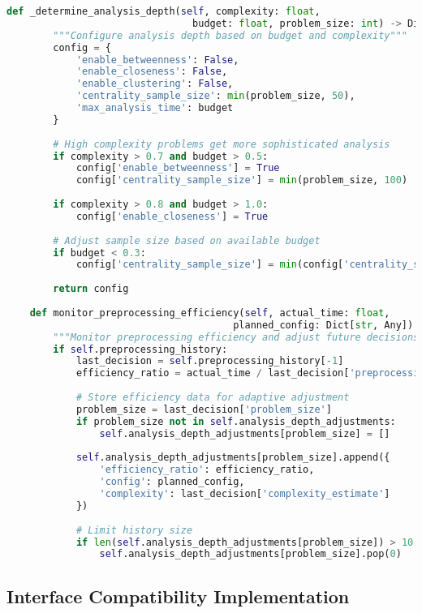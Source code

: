 \begin{lstlisting}[language=Python, caption=Adaptive Timing Synchronisation for Consistent Overhead]
    def _determine_analysis_depth(self, complexity: float, 
                                budget: float, problem_size: int) -> Dict[str, Any]:
        """Configure analysis depth based on budget and complexity"""
        config = {
            'enable_betweenness': False,
            'enable_closeness': False,
            'enable_clustering': False,
            'centrality_sample_size': min(problem_size, 50),
            'max_analysis_time': budget
        }
        
        # High complexity problems get more sophisticated analysis
        if complexity > 0.7 and budget > 0.5:
            config['enable_betweenness'] = True
            config['centrality_sample_size'] = min(problem_size, 100)
        
        if complexity > 0.8 and budget > 1.0:
            config['enable_closeness'] = True
        
        # Adjust sample size based on available budget
        if budget < 0.3:
            config['centrality_sample_size'] = min(config['centrality_sample_size'], 25)
        
        return config
    
    def monitor_preprocessing_efficiency(self, actual_time: float, 
                                       planned_config: Dict[str, Any]) -> None:
        """Monitor preprocessing efficiency and adjust future decisions"""
        if self.preprocessing_history:
            last_decision = self.preprocessing_history[-1]
            efficiency_ratio = actual_time / last_decision['preprocessing_budget']
            
            # Store efficiency data for adaptive adjustment
            problem_size = last_decision['problem_size']
            if problem_size not in self.analysis_depth_adjustments:
                self.analysis_depth_adjustments[problem_size] = []
            
            self.analysis_depth_adjustments[problem_size].append({
                'efficiency_ratio': efficiency_ratio,
                'config': planned_config,
                'complexity': last_decision['complexity_estimate']
            })
            
            # Limit history size
            if len(self.analysis_depth_adjustments[problem_size]) > 10:
                self.analysis_depth_adjustments[problem_size].pop(0)
\end{lstlisting}

\subsection{Interface Compatibility Implementation}
\label{appendix:interface-compatibility}

